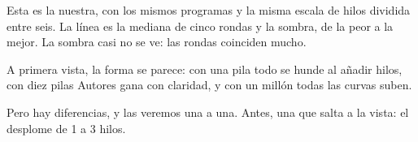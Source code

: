 Esta es la nuestra, con los mismos programas y la misma escala de hilos dividida entre seis. La línea es la mediana de cinco rondas y la sombra, de la peor a la mejor. La sombra casi no se ve: las rondas coinciden mucho.

A primera vista, la forma se parece: con una pila todo se hunde al añadir hilos, con diez pilas Autores gana con claridad, y con un millón todas las curvas suben.

Pero hay diferencias, y las veremos una a una. Antes, una que salta a la vista: el desplome de 1 a 3 hilos.
